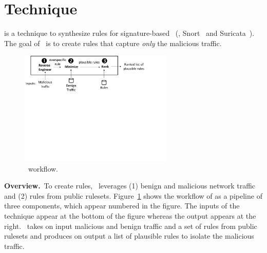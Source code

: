 \documentclass[sigconf,anonymous]{acmart}
\begin{document}
\section{Technique}

\tname{} is a technique to synthesize rules for signature-based
\nids~(\eg{}, Snort~\cite{snort} and Suricata~\cite{suricata}). The
goal of \tname\ is to create rules that capture \emph{only} the
malicious traffic.

\begin{figure}[t]
\centering
\includegraphics[trim=0 350 100 0,clip,width=0.65\textwidth]{figs/nids-workflow}
\caption{\tname\ workflow.}
\label{fig:overview}
\end{figure}

\vspace{1ex}
\noindent\textbf{Overview.}~To create rules, \tname\ leverages (1)
benign and malicious network traffic and (2) rules from public
rulesets. Figure~\ref{fig:overview} shows the workflow of \tname{} as
a pipeline of three components, which appear numbered in the figure.
The inputs of the technique appear at the bottom of the figure whereas
the output appears at the right. \tname\ takes on input malicious and
benign traffic and a set of rules from public rulesets and produces on
output a list of plausible rules to isolate the malicious traffic.
\end{document}
